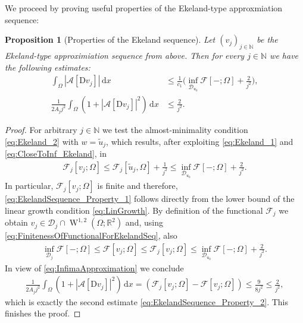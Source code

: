 \documentclass[a4paper,10pt,reqno,oneside]{amsart}
\numberwithin{equation}{section}
\newcommand{\R}{\mathbb R}
\newcommand{\N}{\mathbb N}
\newcommand{\A}{\mathscr{A}}
\newcommand{\sobo}{\operatorname{W}}
\newcommand{\D}{\mathrm{D}}
\newcommand{\dx}[1]{\,\mathrm{d}#1}
\newcommand{\abs}[1]{\left\lvert#1\right\rvert}
\newcommand{\F}{\mathscr{F}}
\newtheorem{prop}[thm]{Proposition}
\begin{document}
\pagebreak\noindent 
We proceed by proving useful properties of the Ekeland-type approxmiation sequence:
\begin{prop}[Properties of the Ekeland sequence]\label{prop:EkelandSequence}
	Let $(v_j)_{j\in\N}$ be the Ekeland-type approximiation sequence from above. Then for every $j\in\N$ we have the following estimates:
	\begin{align}
		\int_\Omega \abs{\A[\D v_j]} \dx{x}& \leq \frac{1}{c_1} \bigg(\inf_{\mathscr{D}_{u_0}} \F[-;\Omega] + \frac{2}{j^2}\bigg),\label{eq:EkelandSequence_Property_1}\\
		\frac{1}{2A_j j^2} \int_\Omega (1+\abs{\A[\D v_j]}^2)\dx{x}& \leq \frac{2}{j^2}\label{eq:EkelandSequence_Property_2}. 
	\end{align}
\end{prop}
\begin{proof}
	For arbitrary $j\in\N$ we test the almost-minimality condition \eqref{eq:Ekeland_2} with $w=\tilde{u}_j$, which results, after exploiting \eqref{eq:Ekeland_1} and \eqref{eq:CloseToInf_Ekeland}, in
	\begin{align}\label{eq:FinitenessOfFunctionalForEkelandSeq}
		\F_j[v_j;\Omega] \leq \F_j[\tilde{u}_j,\Omega] + \frac{1}{j^2}\leq \inf_{\mathscr{D}_{u_0} }\F[-;\Omega] + \frac{2}{j^2}.
	\end{align}
	In particular, $\F_j[{v_j};\Omega]$ is finite and therefore, \eqref{eq:EkelandSequence_Property_1} follows directly from the lower bound of the linear growth condition \eqref{eq:LinGrowth}. By definition of the functional $\F_j$ we obtain $v_j\in\mathscr{D}_j\cap \sobo^{1,2}(\Omega;\R^2)$ and, using \eqref{eq:FinitenessOfFunctionalForEkelandSeq}, also 
	\begin{align*}
		\inf_{\mathscr{D}_j} \F[-;\Omega] \leq \F[v_j; \Omega] \leq \F_j[v_j;\Omega] \leq 	\inf_{\mathscr{D}_{u_0} }\F[-;\Omega] +\frac{2}{j^2}.
	\end{align*}
	In view of \eqref{eq:InfimaApproximation} we conclude
	\begin{align*}
		\frac{1}{2A_j j^2} \int_\Omega (1+\abs{\A[\D v_j]}^2) \dx{x}  = \left(\F_j[v_j;\Omega] - \F[v_j; \Omega]\right) \leq \frac{9}{8j^2}\le\frac{2}{j^2},
	\end{align*}
	which is exactly the second estimate \eqref{eq:EkelandSequence_Property_2}. This finishes the proof. 
\end{proof}
\end{document}
